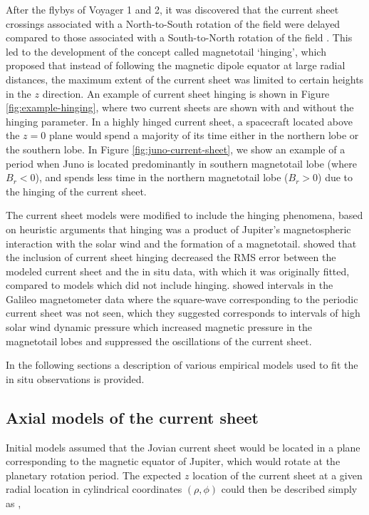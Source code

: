  After the flybys of Voyager 1 and 2, it was discovered that the current sheet crossings associated with a North-to-South rotation of the field were delayed compared to those associated with a South-to-North rotation of the field \cite{Behannon1981}. This led to the development of the concept called magnetotail `hinging', which proposed that instead of following the magnetic dipole equator at large radial distances, the maximum  extent of the current sheet was limited to certain heights in the $z$ direction. An example of current sheet hinging is shown in Figure \ref{fig:example-hinging}, where two current sheets are shown with and without the hinging parameter. In a highly hinged current sheet, a spacecraft located above the $z=0$ plane would spend a majority of its time either in the northern lobe or the southern lobe. In Figure \ref{fig:juno-current-sheet}, we show an example of a period when Juno is located predominantly in southern magnetotail lobe (where $B_r<0$), and spends less time in the northern magnetotail lobe ($B_r>0$) due to the hinging of the current sheet. 
 
The current sheet models were modified to include the hinging phenomena, based on heuristic arguments that hinging was a product of Jupiter's magnetospheric interaction with the solar wind and the formation of a magnetotail.  showed that the inclusion of current sheet hinging decreased the RMS error between the modeled current sheet and the in situ data, with which it was originally fitted, compared to models which did not include hinging.  showed intervals in the Galileo magnetometer data where the square-wave corresponding to the periodic current sheet was not seen, which they suggested corresponds to intervals of high solar wind dynamic pressure which increased magnetic pressure in the magnetotail lobes and suppressed the oscillations of the current sheet. 
 
In the following sections a description of various empirical models used to fit the in situ observations is provided. 

\subsection{Axial models of the current sheet}
Initial models assumed that the Jovian current sheet would be located in a plane corresponding to the magnetic equator of Jupiter, which would rotate at the planetary rotation period. The expected $z$ location of the current sheet at a given radial location in cylindrical coordinates $(\rho, \phi)$ could then be described simply as \cite{VanAllen1974EnergeticJupiter,Goertz1976TheMagnetosphere},

